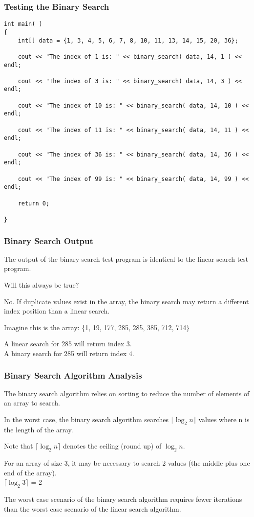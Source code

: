 \begin{frame}[fragile]
\frametitle{Testing the Binary Search}

{\scriptsize
\begin{verbatim}
int main( )
{
    int[] data = {1, 3, 4, 5, 6, 7, 8, 10, 11, 13, 14, 15, 20, 36};

    cout << "The index of 1 is: " << binary_search( data, 14, 1 ) << endl;
    
    cout << "The index of 3 is: " << binary_search( data, 14, 3 ) << endl;
    
    cout << "The index of 10 is: " << binary_search( data, 14, 10 ) << endl;
    
    cout << "The index of 11 is: " << binary_search( data, 14, 11 ) << endl;
    
    cout << "The index of 36 is: " << binary_search( data, 14, 36 ) << endl;
    
    cout << "The index of 99 is: " << binary_search( data, 14, 99 ) << endl;
    
    return 0;
        
}
\end{verbatim}
}

\end{frame}

\begin{frame}
\frametitle{Binary Search Output}

The output of the binary search test program is identical to the linear search test program.

Will this always be true?

No. If duplicate values exist in the array, the binary search may return a different index position than a linear search.

Imagine this is the array: \{1, 19, 177, 285, 285, 385, 712, 714\}

A linear search for 285 will return index 3.\\
A binary search for 285 will return index 4. 

\end{frame}


\begin{frame}
\frametitle{Binary Search Algorithm Analysis}

The binary search algorithm relies on sorting to reduce the number of elements of an array to search.

In the worst case, the binary search algorithm searches $\lceil \log_{2}n\rceil$ values where n is the length of the array.

Note that $\lceil \log_{2}n\rceil$ denotes the ceiling (round up) of $\log_{2}n$.

For an array of size 3, it may be necessary to search 2 values (the middle plus one end of the array).\\
\quad   $\lceil \log_{2}3\rceil$ = 2

The worst case scenario of the binary search algorithm requires fewer iterations than the worst case scenario of the linear search algorithm.


\end{frame}

